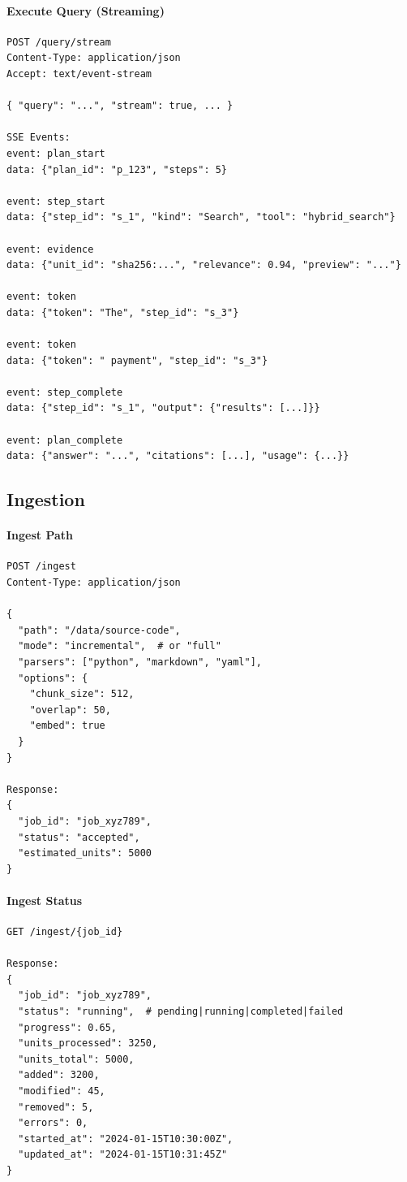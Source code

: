 \paragraph{Execute Query (Streaming)}
\begin{verbatim}
POST /query/stream
Content-Type: application/json
Accept: text/event-stream

{ "query": "...", "stream": true, ... }

SSE Events:
event: plan_start
data: {"plan_id": "p_123", "steps": 5}

event: step_start
data: {"step_id": "s_1", "kind": "Search", "tool": "hybrid_search"}

event: evidence
data: {"unit_id": "sha256:...", "relevance": 0.94, "preview": "..."}

event: token
data: {"token": "The", "step_id": "s_3"}

event: token
data: {"token": " payment", "step_id": "s_3"}

event: step_complete
data: {"step_id": "s_1", "output": {"results": [...]}}

event: plan_complete
data: {"answer": "...", "citations": [...], "usage": {...}}
\end{verbatim}

\subsection{Ingestion}
\label{sec:api:ingest}

\paragraph{Ingest Path}
\begin{verbatim}
POST /ingest
Content-Type: application/json

{
  "path": "/data/source-code",
  "mode": "incremental",  # or "full"
  "parsers": ["python", "markdown", "yaml"],
  "options": {
    "chunk_size": 512,
    "overlap": 50,
    "embed": true
  }
}

Response:
{
  "job_id": "job_xyz789",
  "status": "accepted",
  "estimated_units": 5000
}
\end{verbatim}

\paragraph{Ingest Status}
\begin{verbatim}
GET /ingest/{job_id}

Response:
{
  "job_id": "job_xyz789",
  "status": "running",  # pending|running|completed|failed
  "progress": 0.65,
  "units_processed": 3250,
  "units_total": 5000,
  "added": 3200,
  "modified": 45,
  "removed": 5,
  "errors": 0,
  "started_at": "2024-01-15T10:30:00Z",
  "updated_at": "2024-01-15T10:31:45Z"
}
\end{verbatim}

